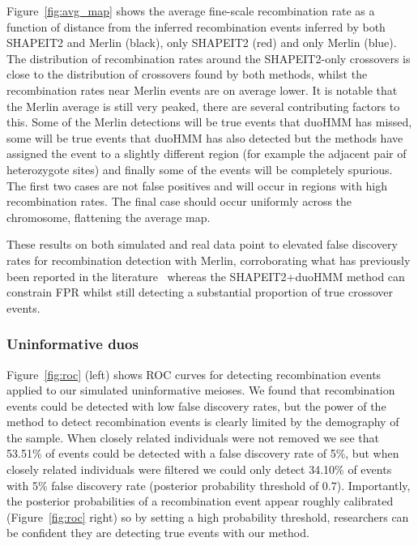 Figure~\ref{fig:avg_map} shows the average fine-scale recombination rate as a function of distance from the inferred recombination events inferred by both SHAPEIT2 and Merlin (black), only SHAPEIT2 (red) and only Merlin (blue).  The distribution of recombination rates around the SHAPEIT2-only crossovers is close to the distribution of crossovers found by both methods, whilst the recombination rates near Merlin events are on average lower.  It is notable that the Merlin average is still very peaked, there are several contributing factors to this.  Some of the Merlin detections will be true events that duoHMM has missed, some will be true events that duoHMM has also detected but the methods have assigned the event to a slightly different region (for example the adjacent pair of heterozygote sites) and finally some of the events will be completely spurious.  The first two cases are not false positives and will occur in regions with high recombination rates. The final case should occur uniformly across the chromosome, flattening the average map.  

These results on both simulated and real data point to elevated false discovery rates for recombination detection with Merlin, corroborating what has previously been reported in the literature~\citep{coop2008high} whereas the SHAPEIT2+duoHMM method can constrain FPR whilst still detecting a substantial proportion of true crossover events.



\clearpage
\subsubsection{Uninformative duos}
Figure~\ref{fig:roc} (left) shows ROC curves for detecting recombination events applied to our simulated uninformative meioses.  We found that recombination events could be detected with low false discovery rates, but the power of the method to detect recombination events is clearly limited by the demography of the sample.  When closely related individuals were not removed we see that 53.51\% of events could be detected with a false discovery rate  of 5\%, but when closely related individuals were filtered we could only detect 34.10\% of events with 5\% false discovery rate (posterior probability threshold of 0.7).  Importantly, the posterior probabilities of a recombination event appear roughly calibrated (Figure~\ref{fig:roc} right) so by setting a high probability threshold, researchers can be confident they are detecting true events with our method.  

